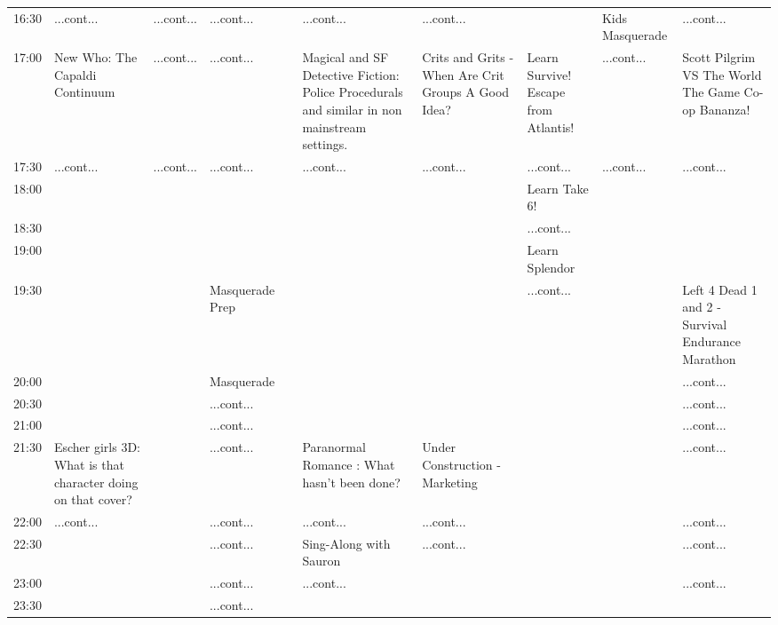 \documentclass{scrreprt}
\begin{document}
\begin{landscape}
\begin{tabular}{c||p{25mm}|p{25mm}|p{25mm}|p{25mm}|p{25mm}|p{25mm}|p{25mm}|p{25mm}|p{25mm}|}
16:30&\cellcolor[gray]{0.704118} ...cont...&\cellcolor[gray]{0.619790} ...cont...&\cellcolor[gray]{0.991209} ...cont...&&\cellcolor[gray]{0.770194} ...cont...&\cellcolor[gray]{0.670247} ...cont...&&\cellcolor[gray]{0.915626} Kids Masquerade&\cellcolor[gray]{0.817675} ...cont...\\
17:00&\cellcolor[gray]{0.720499} New Who: The Capaldi Continuum&\cellcolor[gray]{0.619790} ...cont...&\cellcolor[gray]{0.991209} ...cont...&&\cellcolor[gray]{0.532212} Magical and SF Detective Fiction: Police Procedurals and similar in non mainstream settings.&\cellcolor[gray]{0.519958} Crits and Grits - When Are Crit Groups A Good Idea?&\cellcolor[gray]{0.747025} Learn Survive! Escape from Atlantis!&\cellcolor[gray]{0.915626} ...cont...&\cellcolor[gray]{0.892501} Scott Pilgrim VS The World The Game Co-op Bananza!\\
17:30&\cellcolor[gray]{0.720499} ...cont...&\cellcolor[gray]{0.619790} ...cont...&\cellcolor[gray]{0.991209} ...cont...&&\cellcolor[gray]{0.532212} ...cont...&\cellcolor[gray]{0.519958} ...cont...&\cellcolor[gray]{0.747025} ...cont...&\cellcolor[gray]{0.915626} ...cont...&\cellcolor[gray]{0.892501} ...cont...\\
18:00&&&&&&&\cellcolor[gray]{0.551659} Learn Take 6!&&\\
18:30&&&&&&&\cellcolor[gray]{0.551659} ...cont...&&\\
19:00&&&&&&&\cellcolor[gray]{0.692978} Learn Splendor&&\\
19:30&&&\cellcolor[gray]{0.761991} Masquerade Prep&&&&\cellcolor[gray]{0.692978} ...cont...&&\cellcolor[gray]{0.902170} Left 4 Dead 1 and 2 - Survival Endurance Marathon\\
20:00&&&\cellcolor[gray]{0.633920} Masquerade&&&&&&\cellcolor[gray]{0.902170} ...cont...\\
20:30&&&\cellcolor[gray]{0.633920} ...cont...&&&&&&\cellcolor[gray]{0.902170} ...cont...\\
21:00&&&\cellcolor[gray]{0.633920} ...cont...&&&&&&\cellcolor[gray]{0.902170} ...cont...\\
21:30&\cellcolor[gray]{0.954405} Escher girls 3D: What is that character doing on that cover?&&\cellcolor[gray]{0.633920} ...cont...&&\cellcolor[gray]{0.837149} Paranormal Romance : What hasn't been done?&\cellcolor[gray]{0.765374} Under Construction - Marketing&&&\cellcolor[gray]{0.902170} ...cont...\\
22:00&\cellcolor[gray]{0.954405} ...cont...&&\cellcolor[gray]{0.633920} ...cont...&&\cellcolor[gray]{0.837149} ...cont...&\cellcolor[gray]{0.765374} ...cont...&&&\cellcolor[gray]{0.902170} ...cont...\\
22:30&&&\cellcolor[gray]{0.633920} ...cont...&&\cellcolor[gray]{0.684410} Sing-Along with Sauron&\cellcolor[gray]{0.765374} ...cont...&&&\cellcolor[gray]{0.902170} ...cont...\\
23:00&&&\cellcolor[gray]{0.633920} ...cont...&&\cellcolor[gray]{0.684410} ...cont...&&&&\cellcolor[gray]{0.902170} ...cont...\\
23:30&&&\cellcolor[gray]{0.633920} ...cont...&&&&&&\\\end{tabular}

\end{landscape}
\end{document}
